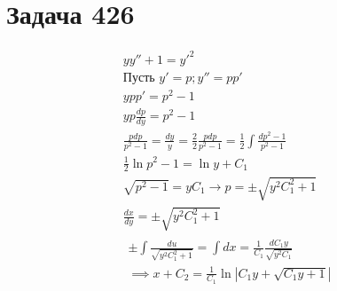 \section{Задача 426}

\begin{gather}
  yy''+1=y'^2 \\
  \text{Пусть } y' = p; y'' = pp' \\
  ypp' = p^2 -1 \\
  yp \frac{dp}{dy}=p^2-1 \\
  \frac{pdp}{p^2-1} = \frac{dy}{y} = \frac{2}{2} \frac{pdp}{p^2-1} = \frac{1}{2} \int \frac{dp^2-1}{p^2-1} \\
  \frac{1}{2} \ln p^2 - 1 = \ln y + C_1 \\
  \sqrt{p^2 - 1} = yC_1 \rightarrow p = \pm \sqrt{y^2C_1^2+1} \\
  \frac{dx}{dy} = \pm \sqrt{y^2 C_1^2 + 1} \\
  \begin{split}
    \pm \int \frac{du}{\sqrt{y^2C_1^2+1}} = \int dx = \frac{1}{C_1} \frac{dC_1y}{\sqrt{y^2 C_1}} \\
    \implies x + C_2 = \frac{1}{C_1} \ln |C_1 y + \sqrt{C_1y+1}|
  \end{split}
\end{gather}


